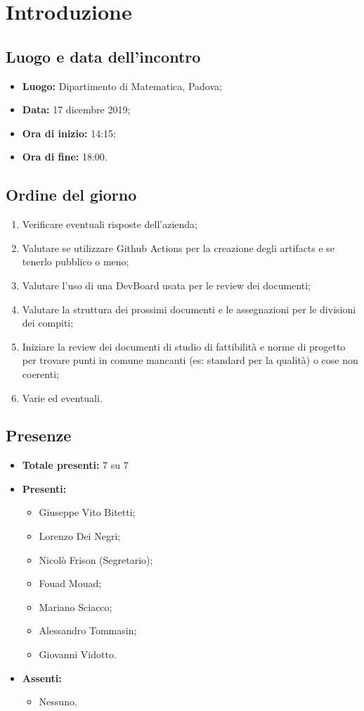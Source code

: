 \section*{Introduzione}

\subsection*{Luogo e data dell'incontro}
	\begin{itemize}
		\item \textbf{Luogo:} Dipartimento di Matematica, Padova;
		\item \textbf{Data:} 17 dicembre 2019;
		\item \textbf{Ora di inizio:} 14:15;
		\item \textbf{Ora di fine:} 18:00.
	\end{itemize}

\subsection*{Ordine del giorno}
	\begin{enumerate}
		\item Verificare eventuali risposte dell'azienda;
		\item Valutare se utilizzare Github Actions per la creazione degli artifacts e se tenerlo pubblico o meno;
		\item Valutare l'uso di una DevBoard usata per le review dei documenti;
		\item Valutare la struttura dei prossimi documenti e le assegnazioni per le divisioni dei compiti;
		\item Iniziare la review dei documenti di studio di fattibilità e norme di progetto per trovare punti in comune mancanti (es: standard per la qualità) o cose non coerenti;
		\item Varie ed eventuali.
	\end{enumerate}

\subsection*{Presenze}
	\begin{itemize}
		\item \textbf{Totale presenti:} 7 su 7
		\item \textbf{Presenti: }
			\begin{itemize}			
				\item Giuseppe Vito Bitetti;
				\item Lorenzo Dei Negri;
				\item Nicolò Frison (Segretario);
				\item Fouad Mouad;
				\item Mariano Sciacco;
				\item Alessandro Tommasin;
				\item Giovanni Vidotto.
			\end{itemize}
		\item \textbf{Assenti: } 
			\begin{itemize}	
				\item Nessuno.
			\end{itemize}
	\end{itemize}


